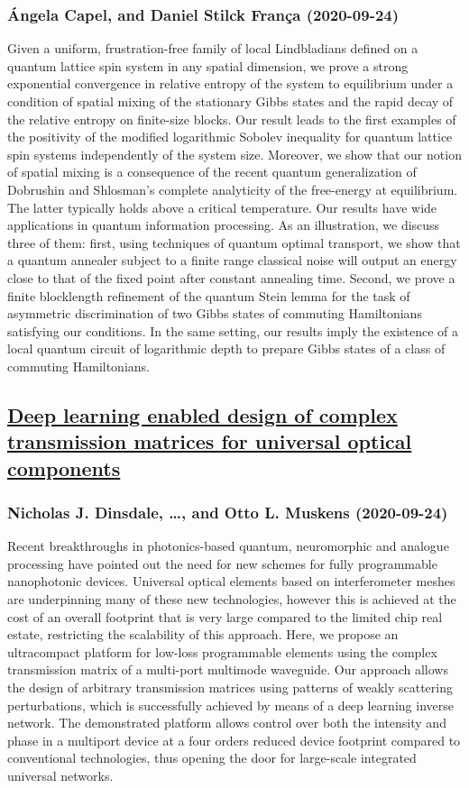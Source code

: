 \subsubsection*{Ángela Capel, and Daniel Stilck França (2020-09-24)}
Given a uniform, frustration-free family of local Lindbladians defined on a
quantum lattice spin system in any spatial dimension, we prove a strong
exponential convergence in relative entropy of the system to equilibrium under
a condition of spatial mixing of the stationary Gibbs states and the rapid
decay of the relative entropy on finite-size blocks. Our result leads to the
first examples of the positivity of the modified logarithmic Sobolev inequality
for quantum lattice spin systems independently of the system size. Moreover, we
show that our notion of spatial mixing is a consequence of the recent quantum
generalization of Dobrushin and Shlosman's complete analyticity of the
free-energy at equilibrium. The latter typically holds above a critical
temperature.
  Our results have wide applications in quantum information processing. As an
illustration, we discuss three of them: first, using techniques of quantum
optimal transport, we show that a quantum annealer subject to a finite range
classical noise will output an energy close to that of the fixed point after
constant annealing time. Second, we prove a finite blocklength refinement of
the quantum Stein lemma for the task of asymmetric discrimination of two Gibbs
states of commuting Hamiltonians satisfying our conditions. In the same
setting, our results imply the existence of a local quantum circuit of
logarithmic depth to prepare Gibbs states of a class of commuting Hamiltonians.

\subsection*{\href{http://arxiv.org/abs/2009.11810v1}{Deep learning enabled design of complex transmission matrices for  universal optical components}}
\subsubsection*{Nicholas J. Dinsdale, \dots, and Otto L. Muskens (2020-09-24)}
Recent breakthroughs in photonics-based quantum, neuromorphic and analogue
processing have pointed out the need for new schemes for fully programmable
nanophotonic devices. Universal optical elements based on interferometer meshes
are underpinning many of these new technologies, however this is achieved at
the cost of an overall footprint that is very large compared to the limited
chip real estate, restricting the scalability of this approach. Here, we
propose an ultracompact platform for low-loss programmable elements using the
complex transmission matrix of a multi-port multimode waveguide. Our approach
allows the design of arbitrary transmission matrices using patterns of weakly
scattering perturbations, which is successfully achieved by means of a deep
learning inverse network. The demonstrated platform allows control over both
the intensity and phase in a multiport device at a four orders reduced device
footprint compared to conventional technologies, thus opening the door for
large-scale integrated universal networks.

